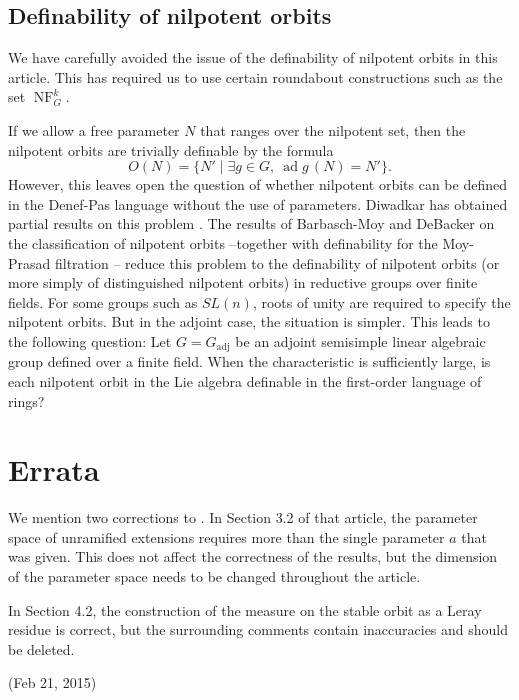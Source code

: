 \documentclass[12pt]{amsart}
\newcommand{\op}[1]{\operatorname{#1}}
\def\NF{\op{NF}}
\theoremstyle{plain}
\theoremstyle{definition}
\begin{document}
\subsection{Definability of nilpotent orbits}

We have carefully avoided the issue of the definability of nilpotent
orbits in this article.  This has required us to use certain roundabout
constructions such as the set $\NF^k_G$.

If we allow a free parameter $N$ that ranges over the nilpotent set,
then the nilpotent orbits are trivially definable by the formula
\[
O(N) = \{N' \mid \exists g\in G,~ \op{ad}g\,(N) = N' \}.
\]  
However, this leaves open the question of whether nilpotent orbits can
be defined in the Denef-Pas language without the use of parameters.
Diwadkar has obtained partial results on this problem
\cite{diwadkar2006nilpoten}.  The results of Barbasch-Moy and DeBacker
on the classification of nilpotent orbits --together with definability
for the Moy-Prasad filtration \cite{CGH} -- reduce this problem to the
definability of nilpotent orbits (or more simply of distinguished
nilpotent orbits) in reductive groups over finite fields.  For some
groups such as $SL(n)$, roots of unity are required to specify the
nilpotent orbits.  But in the adjoint case, the situation is
simpler. This leads to the following question: Let $G=G_{\op{adj}}$ be
an adjoint semisimple linear algebraic group defined over a finite
field.  When the characteristic is sufficiently large, is each
nilpotent orbit in the Lie algebra definable in the first-order
language of rings?

\section{Errata}

We mention two corrections to \cite{CHL}.  In Section 3.2 of that
article, the parameter space of unramified extensions requires more
than the single parameter $a$ that was given.  This does not affect
the correctness of the results, but the dimension of the parameter
space needs to be changed throughout the article.

In Section 4.2, the construction of the measure on the stable orbit as
a Leray residue is correct, but the surrounding comments contain
inaccuracies and should be deleted.






(Feb 21, 2015)
\end{document}
